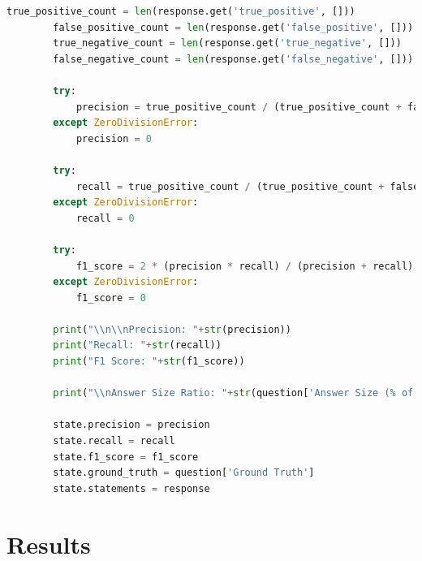 \begin{lstlisting}[style=mystyle, language=Python, caption={C\'{o}digo para LLM-as-a-Judge}, label={code:llm-judge}]
        true_positive_count = len(response.get('true_positive', []))
        false_positive_count = len(response.get('false_positive', []))
        true_negative_count = len(response.get('true_negative', []))
        false_negative_count = len(response.get('false_negative', []))

        try:
            precision = true_positive_count / (true_positive_count + false_positive_count)
        except ZeroDivisionError:
            precision = 0
        
        try:
            recall = true_positive_count / (true_positive_count + false_negative_count)
        except ZeroDivisionError:
            recall = 0

        try:
            f1_score = 2 * (precision * recall) / (precision + recall)
        except ZeroDivisionError:
            f1_score = 0
            
        print("\\n\\nPrecision: "+str(precision))
        print("Recall: "+str(recall))
        print("F1 Score: "+str(f1_score))

        print("\\nAnswer Size Ratio: "+str(question['Answer Size (% of GT)']))

        state.precision = precision
        state.recall = recall
        state.f1_score = f1_score
        state.ground_truth = question['Ground Truth']
        state.statements = response
\end{lstlisting}

    \section{Results}
    \label{sec:exp2_appendix}



